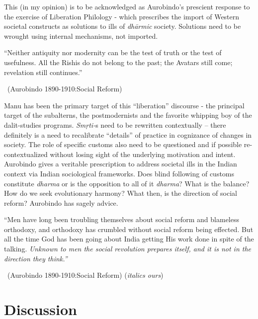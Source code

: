 This (in my opinion) is to be acknowledged as Aurobindo's prescient response to the exercise of Liberation Philology - which prescribes the import of Western societal constructs as solutions to ills of \textit{dhārmic} society. Solutions need to be wrought using internal mechanisms, not imported.

\begin{myquote}
“Neither antiquity nor modernity can be the test of truth or the test of usefulness. All the Rishis do not belong to the past; the Avatars still come; revelation still continues.” 

~\hfill (Aurobindo 1890-1910:Social Reform)
\end{myquote}

Manu has been the primary target of this “liberation” discourse - the principal target of the subalterns, the postmodernists and the favorite whipping boy of the dalit-studies programs. \textit{Smṛti-}s need to be rewritten contextually – there definitely is a need to recalibrate “details” of practice in cognizance of changes in society. The role of specific customs also need to be questioned and if possible re-contextualized without losing sight of the underlying motivation and intent. Aurobindo gives a veritable prescription to address societal ills in the Indian context via Indian sociological frameworks. Does blind following of customs constitute \textit{dharma} or is the opposition to all of it \textit{dharma}? What is the balance? How do we seek evolutionary harmony? What then, is the direction of social reform? Aurobindo has sagely advice.

\begin{myquote}
“Men have long been troubling themselves about social reform and blameless orthodoxy, and orthodoxy has crumbled without social reform being effected. But all the time God has been going about India getting His work done in spite of the talking. \textit{Unknown to men the social revolution prepares itself, and it is not in the direction they think.”} 

~\hfill (Aurobindo 1890-1910:Social Reform) (\textit{italics ours})
\end{myquote}


\section*{Discussion}

